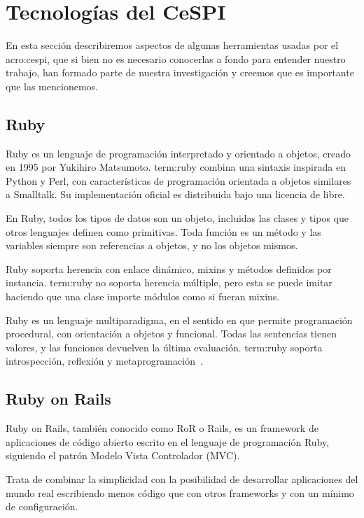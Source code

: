 \section{Tecnologías del CeSPI}
\label{anexo:A}

En esta sección describiremos aspectos de algunas herramientas usadas por el
\gls{acro:cespi}, que si bien no es necesario conocerlas a fondo para entender
nuestro trabajo, han formado parte de nuestra investigación y creemos que es
importante que las mencionemos.

\subsection{Ruby}

Ruby es un lenguaje de programación interpretado y orientado a objetos, creado
en 1995 por Yukihiro Matsumoto. \gls{term:ruby} combina una sintaxis inspirada
en Python y Perl, con características de programación orientada a objetos
similares a Smalltalk. Su implementación oficial es distribuida bajo una
licencia de  libre.

En Ruby, todos los tipos de datos son un objeto, incluidas las clases y tipos
que otros lenguajes definen como primitivas. Toda función es un método y las
variables siempre son referencias a objetos, y no los objetos mismos.

Ruby soporta herencia con enlace dinámico, mixins y métodos definidos por
instancia. \gls{term:ruby} no soporta herencia múltiple, pero esta se puede
imitar haciendo que una clase importe módulos como si fueran mixins.

Ruby es un lenguaje multiparadigma, en el sentido en que permite programación
procedural, con orientación a objetos y funcional. Todas las sentencias tienen
valores, y las funciones devuelven la última evaluación. \gls{term:ruby}
soporta introspección, reflexión y metaprogramación~\cite{ruby}.

\subsection{Ruby on Rails}

Ruby on Rails, también conocido como RoR o Rails, es un framework de
aplicaciones  de código abierto escrito en el lenguaje de programación
Ruby, siguiendo el patrón Modelo Vista Controlador (MVC).

Trata de combinar la simplicidad con la posibilidad de desarrollar aplicaciones
del mundo real escribiendo menos código que con otros frameworks y con un
mínimo de configuración.

